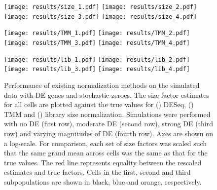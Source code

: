 \documentclass{article}
\begin{document}
\begin{figure}[tbp]
\begin{minipage}{0.33\textwidth}
\texttt{[image: results/size\_1.pdf]}
\texttt{[image: results/size\_2.pdf]}
\texttt{[image: results/size\_3.pdf]}
\texttt{[image: results/size\_4.pdf]}
\subcaption{}\label{subfig:size_sim}
\end{minipage}
\begin{minipage}{0.33\textwidth}
\texttt{[image: results/TMM\_1.pdf]}
\texttt{[image: results/TMM\_2.pdf]}
\texttt{[image: results/TMM\_3.pdf]}
\texttt{[image: results/TMM\_4.pdf]}
\subcaption{}\label{subfig:tmm_sim}
\end{minipage}
\begin{minipage}{0.33\textwidth}
\texttt{[image: results/lib\_1.pdf]}
\texttt{[image: results/lib\_2.pdf]}
\texttt{[image: results/lib\_3.pdf]}
\texttt{[image: results/lib\_4.pdf]}
\subcaption{}\label{subfig:lib_sim}
\end{minipage}
\caption{
    Performance of existing normalization methods on the simulated data with DE genes and stochastic zeroes.
    The size factor estimates for all cells are plotted against the true values for () DESeq,
        () TMM and () library size normalization.
    Simulations were performed with no DE (first row), moderate DE (second row), strong DE (third row) and varying magnitudes of DE (fourth row).
    Axes are shown on a log-scale.
    For comparison, each set of size factors was scaled such that the same grand mean across cells was the same as that for the true values.
    The red line represents equality between the rescaled estimates and true factors.
    Cells in the first, second and third subpopulations are shown in black, blue and orange, respectively.
}
\label{fig:existing_sim}
\end{figure}
\end{document}
